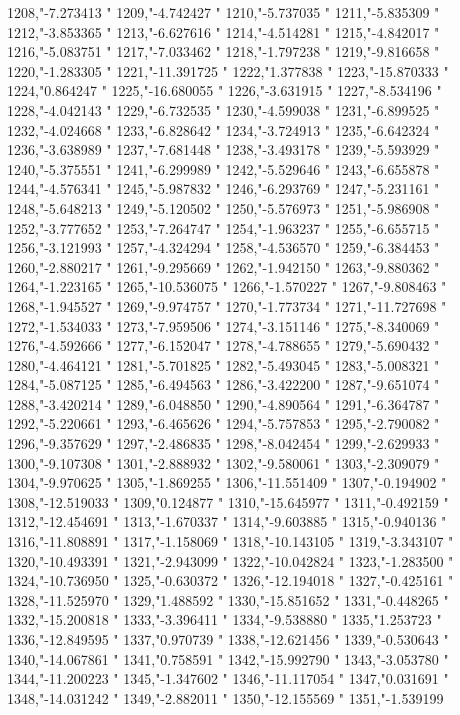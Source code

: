 1208,"-7.273413
"
1209,"-4.742427
"
1210,"-5.737035
"
1211,"-5.835309
"
1212,"-3.853365
"
1213,"-6.627616
"
1214,"-4.514281
"
1215,"-4.842017
"
1216,"-5.083751
"
1217,"-7.033462
"
1218,"-1.797238
"
1219,"-9.816658
"
1220,"-1.283305
"
1221,"-11.391725
"
1222,"1.377838
"
1223,"-15.870333
"
1224,"0.864247
"
1225,"-16.680055
"
1226,"-3.631915
"
1227,"-8.534196
"
1228,"-4.042143
"
1229,"-6.732535
"
1230,"-4.599038
"
1231,"-6.899525
"
1232,"-4.024668
"
1233,"-6.828642
"
1234,"-3.724913
"
1235,"-6.642324
"
1236,"-3.638989
"
1237,"-7.681448
"
1238,"-3.493178
"
1239,"-5.593929
"
1240,"-5.375551
"
1241,"-6.299989
"
1242,"-5.529646
"
1243,"-6.655878
"
1244,"-4.576341
"
1245,"-5.987832
"
1246,"-6.293769
"
1247,"-5.231161
"
1248,"-5.648213
"
1249,"-5.120502
"
1250,"-5.576973
"
1251,"-5.986908
"
1252,"-3.777652
"
1253,"-7.264747
"
1254,"-1.963237
"
1255,"-6.655715
"
1256,"-3.121993
"
1257,"-4.324294
"
1258,"-4.536570
"
1259,"-6.384453
"
1260,"-2.880217
"
1261,"-9.295669
"
1262,"-1.942150
"
1263,"-9.880362
"
1264,"-1.223165
"
1265,"-10.536075
"
1266,"-1.570227
"
1267,"-9.808463
"
1268,"-1.945527
"
1269,"-9.974757
"
1270,"-1.773734
"
1271,"-11.727698
"
1272,"-1.534033
"
1273,"-7.959506
"
1274,"-3.151146
"
1275,"-8.340069
"
1276,"-4.592666
"
1277,"-6.152047
"
1278,"-4.788655
"
1279,"-5.690432
"
1280,"-4.464121
"
1281,"-5.701825
"
1282,"-5.493045
"
1283,"-5.008321
"
1284,"-5.087125
"
1285,"-6.494563
"
1286,"-3.422200
"
1287,"-9.651074
"
1288,"-3.420214
"
1289,"-6.048850
"
1290,"-4.890564
"
1291,"-6.364787
"
1292,"-5.220661
"
1293,"-6.465626
"
1294,"-5.757853
"
1295,"-2.790082
"
1296,"-9.357629
"
1297,"-2.486835
"
1298,"-8.042454
"
1299,"-2.629933
"
1300,"-9.107308
"
1301,"-2.888932
"
1302,"-9.580061
"
1303,"-2.309079
"
1304,"-9.970625
"
1305,"-1.869255
"
1306,"-11.551409
"
1307,"-0.194902
"
1308,"-12.519033
"
1309,"0.124877
"
1310,"-15.645977
"
1311,"-0.492159
"
1312,"-12.454691
"
1313,"-1.670337
"
1314,"-9.603885
"
1315,"-0.940136
"
1316,"-11.808891
"
1317,"-1.158069
"
1318,"-10.143105
"
1319,"-3.343107
"
1320,"-10.493391
"
1321,"-2.943099
"
1322,"-10.042824
"
1323,"-1.283500
"
1324,"-10.736950
"
1325,"-0.630372
"
1326,"-12.194018
"
1327,"-0.425161
"
1328,"-11.525970
"
1329,"1.488592
"
1330,"-15.851652
"
1331,"-0.448265
"
1332,"-15.200818
"
1333,"-3.396411
"
1334,"-9.538880
"
1335,"1.253723
"
1336,"-12.849595
"
1337,"0.970739
"
1338,"-12.621456
"
1339,"-0.530643
"
1340,"-14.067861
"
1341,"0.758591
"
1342,"-15.992790
"
1343,"-3.053780
"
1344,"-11.200223
"
1345,"-1.347602
"
1346,"-11.117054
"
1347,"0.031691
"
1348,"-14.031242
"
1349,"-2.882011
"
1350,"-12.155569
"
1351,"-1.539199
